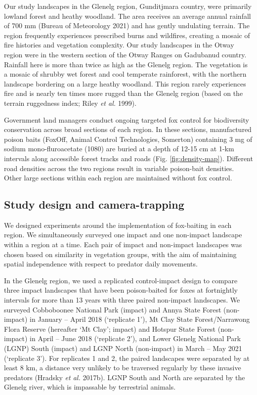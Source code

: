 \documentclass[11pt,a4paper,titlepage,twoside,openright]{style/unimelbthesis}
\begin{document}
\begin{mainmatter}
Our study landscapes in the Glenelg region, Gunditjmara country, were primarily lowland forest and heathy woodland. The area receives an average annual rainfall of 700 mm (Bureau of Meteorology 2021) and has gently undulating terrain. The region frequently experiences prescribed burns and wildfires, creating a mosaic of fire histories and vegetation complexity. Our study landscapes in the Otway region were in the western section of the Otway Ranges on Gadubanud country. Rainfall here is more than twice as high as the Glenelg region. The vegetation is a mosaic of shrubby wet forest and cool temperate rainforest, with the northern landscape bordering on a large heathy woodland. This region rarely experiences fire and is nearly ten times more rugged than the Glenelg region (based on the terrain ruggedness index; Riley \emph{et al.} 1999).

Government land managers conduct ongoing targeted fox control for biodiversity conservation across broad sections of each region. In these sections, manufactured poison baits (FoxOff, Animal Control Technologies, Somerton) containing 3 mg of sodium mono-fluroacetate (1080) are buried at a depth of 12-15 cm at 1-km intervals along accessible forest tracks and roads (Fig. \ref{fig:density-map}). Different road densities across the two regions result in variable poison-bait densities. Other large sections within each region are maintained without fox control.

\hypertarget{study-design-and-camera-trapping}{%
\subsection{Study design and camera-trapping}\label{study-design-and-camera-trapping}}

We designed experiments around the implementation of fox-baiting in each region. We simultaneously surveyed one impact and one non-impact landscape within a region at a time. Each pair of impact and non-impact landscapes was chosen based on similarity in vegetation groups, with the aim of maintaining spatial independence with respect to predator daily movements.

In the Glenelg region, we used a replicated control-impact design to compare three impact landscapes that have been poison-baited for foxes at fortnightly intervals for more than 13 years with three paired non-impact landscapes. We surveyed Cobboboonee National Park (impact) and Annya State Forest (non-impact) in January -- April 2018 (`replicate 1'), Mt Clay State Forest/Narrawong Flora Reserve (hereafter `Mt Clay'; impact) and Hotspur State Forest (non-impact) in April -- June 2018 (`replicate 2'), and Lower Glenelg National Park (LGNP) South (impact) and LGNP North (non-impact) in March -- May 2021 (`replicate 3'). For replicates 1 and 2, the paired landscapes were separated by at least 8 km, a distance very unlikely to be traversed regularly by these invasive predators (Hradsky \emph{et al.} 2017b). LGNP South and North are separated by the Glenelg river, which is impassable by terrestrial animals.


\end{mainmatter}
\end{document}
